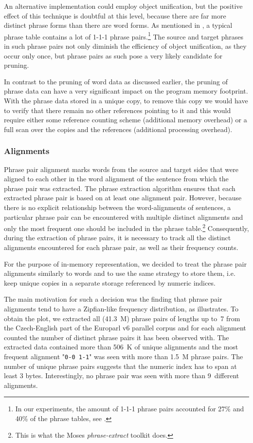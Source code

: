 An alternative implementation could employ object unification, but the positive effect
of this technique is doubtful at this level, because there are far more distinct phrase
forms than there are word forms.
As mentioned in , a typical phrase table contains a lot
of 1-1-1 phrase pairs.\footnote{In our experiments, the amount of 1-1-1 phrase pairs
accounted for 27\% and 40\% of the phrase tables, see .}
The source and target phrases in such phrase pairs not only diminish the
efficiency of object unification, as they occur only once, but phrase pairs as such
pose a very likely candidate for pruning.

In contrast to the pruning of word data as discussed earlier, the pruning of phrase
data can have a very significant impact on the program memory footprint.
With the phrase data stored in a unique copy, to remove this copy we would have to
verify that there remain no other references pointing to it and this would require
either some reference counting scheme (additional memory overhead) or a full scan over
the copies and the references (additional processing overhead).

\subsubsection*{Alignments}

Phrase pair alignment marks words from the source and target sides that were aligned to
each other in the word alignment of the sentence from which the phrase pair was extracted.
The phrase extraction algorithm ensures that each extracted phrase pair is based on
at least one alignment pair.
However, because there is no explicit relationship between the word-alignments of sentences,
a particular phrase pair can be encountered with multiple distinct alignments and only
the most frequent one should be included in the phrase table.\footnote{This is what the Moses \emph{phrase-extract} toolkit does.}
Consequently, during the extraction of phrase pairs, it is necessary to track all the
distinct alignments encountered for each phrase pair, as well as their frequency counts.

For the purpose of in-memory representation, we decided to treat the phrase pair alignments
similarly to words and to use the same strategy to store them, i.e. keep unique copies in
a separate storage referenced by numeric indices.

The main motivation for such a decision was the finding that phrase pair alignments tend to
have a Zipfian-like frequency distribution, as  illustrates.
To obtain the plot, we extracted all (41.3~M) phrase pairs of lengths up to~7 from
the Czech-English part of the Europarl v6 parallel corpus and for each alignment counted
the number of distinct phrase pairs it has been observed with.
The extracted data contained more than 506~K of unique alignments and the most frequent
alignment "\texttt{0-0 1-1}" was seen with more than 1.5~M phrase pairs.
The number of unique phrase pairs suggests that the numeric index has to span at least
3 bytes.
Interestingly, no phrase pair was seen with more than 9~different alignments.

